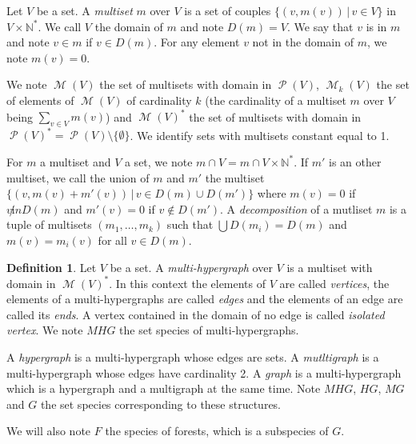 \documentclass[a4paper]{article}
\DeclareMathOperator{\p}{\mathcal{P}}
\DeclareMathOperator{\m}{\mathcal{M}}
\theoremstyle{definition}
\newtheorem{definition}{Definition}
\begin{document}
Let $V$ be a set. A \textit{multiset} $m$ over $V$ is a set of couples $\{(v,m(v))\,|\, v\in V\}$ in $V\times\mathbb{N}^*$. We call $V$ the domain of $m$ and note $D(m)=V$. We say that $v$ is in $m$ and note $v\in m$ if $v\in D(m)$. For any element $v$ not in the domain of $m$, we note $m(v) = 0$.

We note $\m(V)$ the set of multisets with domain in $\p(V)$, $\m_k(V)$ the set of elements of $\m(V)$ of cardinality $k$ (the cardinality of a multiset $m$ over $V$ being $\sum_{v\in V} m(v)$) and $\m(V)^*$ the set of multisets with domain in $\p(V)^* = \p(V)\setminus\{\emptyset\}$. We identify sets with multisets constant equal to 1.


For $m$ a multiset and $V$ a set, we note $m\cap V = m\cap V\times\mathbb{N}^*$. If $m'$ is an other multiset, we call the union of $m$ and $m'$ the multiset $\{(v,m(v)+m'(v))\,|\, v\in D(m)\cup D(m')\}$ where $m(v) = 0$ if $v\not in D(m)$ and $m'(v) = 0$ if $v\not \in D(m')$.
A \textit{decomposition} of a mutliset $m$ is a tuple of multisets $(m_1,\dots, m_k)$ such that $\bigcup D(m_i) = D(m)$ and $m(v) = m_i(v)$ for all $v\in D(m)$.

\begin{definition}
Let $V$ be a set. A \textit{multi-hypergraph} over $V$ is a multiset with domain in $\m(V)^*$. In this context the elements of $V$ are called \textit{vertices}, the elements of a multi-hypergraphs are called \textit{edges} and the elements of an edge are called its \textit{ends}. A vertex contained in the domain of no edge is called \textit{isolated vertex}. We note $MHG$ the set species of multi-hypergraphs.

A \textit{hypergraph} is a multi-hypergraph whose edges are sets. A \textit{mutltigraph} is a multi-hypergraph whose edges have cardinality 2. A \textit{graph} is a multi-hypergraph which is a hypergraph and a multigraph at the same time. Note $MHG$, $HG$, $MG$ and $G$ the set species corresponding to these structures.

We will also note $F$ the species of forests, which is a subspecies of $G$.
\end{definition}
\end{document}
